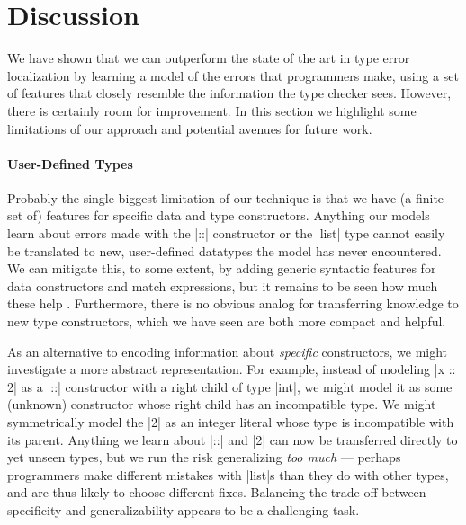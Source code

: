 \section{Discussion}
\label{sec:discussion}

We have shown that we can outperform the state of the art in type error
localization by learning a model of the errors that programmers make,
using a set of features that closely resemble the information the type
checker sees.
%
However, there is certainly room for improvement.
%
In this section we highlight some limitations of our approach and
potential avenues for future work.

\paragraph{User-Defined Types}
Probably the single biggest limitation of our technique is that we have
(a finite set of) features for specific data and type constructors.
%
Anything our models learn about errors made with the |::| constructor or
the |list| type cannot easily be translated to new, user-defined
datatypes the model has never encountered.
%
We can mitigate this, to some extent, by adding generic
syntactic features for data constructors and match expressions, but it
remains to be seen how much these help .
%
Furthermore, there is no obvious analog for transferring knowledge to
new type constructors, which we have seen are both more compact and
helpful.

As an alternative to encoding information about \emph{specific}
constructors, we might investigate a more abstract representation.
%
For example, instead of modeling |x :: 2| as a |::| constructor with a
right child of type |int|, we might model it as some (unknown) constructor
whose right child has an incompatible type.
%
We might symmetrically model the |2| as an integer literal whose type is
incompatible with its parent.
%
Anything we learn about |::| and |2| can now be transferred directly to
yet unseen types, but we run the risk generalizing \emph{too much} ---
\ie perhaps programmers make different mistakes with |list|s than they
do with other types, and are thus likely to choose different fixes.
%
Balancing the trade-off between specificity and generalizability appears
to be a challenging task.


